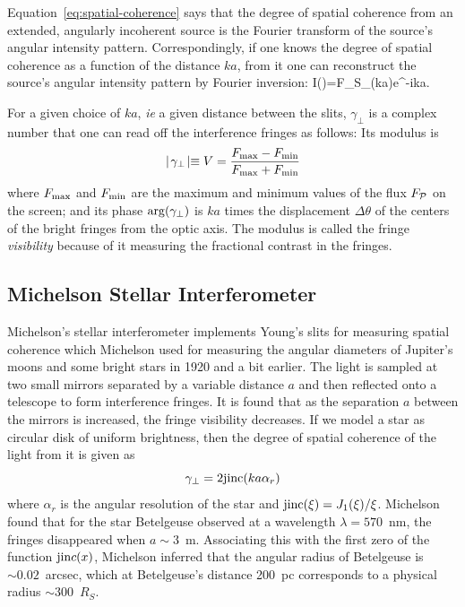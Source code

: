 Equation~\ref{eq:spatial-coherence} says that the degree of spatial coherence from an extended, angularly incoherent source is the Fourier transform of the source's angular intensity pattern. Correspondingly, if one knows the degree of spatial coherence as a function of the distance $ka$, from it one can reconstruct the source's angular intensity pattern by Fourier inversion:
\be
I(\alpha)=F_S\gamma_\perp(ka)e^{-ika\alpha}.
\label{eq:fourier-coherence}
\ee

For a given choice of $ka$, {\it ie} a given distance between the slits, $\gamma_\perp$ is a complex number that one can read off the interference fringes as follows: Its modulus is 
\[
\mid\!\gamma_\perp\!\mid\equiv V={F_{\rm max}-F_{\rm min}\over F_{\rm max}+F_{\rm min}}
\]
where $F_{\rm max}$ and $F_{\rm min}$ are the maximum and minimum values of the flux $F_{{\cal P}}$ on the screen; and its phase ${\rm arg}(\gamma_\perp)$ is $ka$ times the displacement $\Delta\theta$ of the centers of the bright fringes from the optic axis. The modulus is called the fringe {\it visibility} because of it measuring the fractional contrast in the fringes. 

\subsection{Michelson Stellar Interferometer}

Michelson's stellar interferometer implements Young's slits for measuring spatial coherence which Michelson used for measuring the angular diameters of Jupiter's 
moons and some bright stars in 1920 and a bit earlier. The light is sampled at two 
small mirrors separated by a variable distance $a$ and then reflected onto a telescope 
to form interference fringes. It is found that as the separation $a$ between the mirrors 
is increased, the fringe visibility decreases. If we model a star as circular disk of 
uniform brightness, then the degree of spatial coherence of the light from it is given
as 
\[
\gamma_\perp=2{\rm jinc}(ka\alpha_r)
\]
where $\alpha_r$ is the angular resolution of the star and 
${\rm jinc}(\xi)={J_1(\xi)/\xi}$. Michelson found that for the star Betelgeuse observed
at a wavelength $\lambda=570$~nm, the fringes disappeared when $a\sim 3$~m. 
Associating this with the first zero of the function ${\rm jin}c(x)$, Michelson inferred that
the angular radius of Betelgeuse is $\sim 0.02$~arcsec, which at Betelgeuse's distance
200~pc corresponds to a physical radius $\sim 300$~$R_S$.


